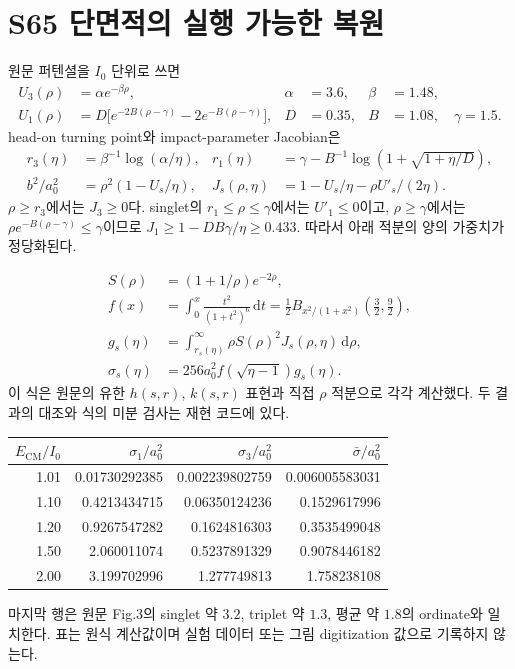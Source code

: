 \documentclass[11pt,a4paper]{article}
\newcommand{\dd}{\mathrm d}\newcommand{\kb}{k_{\rm B}}\newcommand{\ev}{\epsilon_{\rm eV}}\newcommand{\eV}{\mathrm{eV}}\newcommand{\cm}{\mathrm{CM}}\newcommand{\lab}{\mathrm{lab}}
\numberwithin{equation}{section}
\begin{document}
\newpage
\section{S65 단면적의 실행 가능한 복원}
원문 퍼텐셜을 $I_0$ 단위로 쓰면
\begin{align}
U_3(\rho)&=\alpha e^{-\beta\rho},& \alpha&=3.6,&\beta&=1.48,\\
U_1(\rho)&=D\bigl[e^{-2B(\rho-\gamma)}-2e^{-B(\rho-\gamma)}\bigr],
&D&=0.35,&B&=1.08,\quad\gamma=1.5 .
\end{align}
head-on turning point와 impact-parameter Jacobian은
\begin{align}
r_3(\eta)&=\beta^{-1}\log(\alpha/\eta),&
r_1(\eta)&=\gamma-B^{-1}\log(1+\sqrt{1+\eta/D}),\\
b^2/a_0^2&=\rho^2(1-U_s/\eta),&
J_s(\rho,\eta)&=1-U_s/\eta-\rho U'_s/(2\eta).
\end{align}
$\rho\ge r_3$에서는 $J_3\ge0$다. singlet의 $r_1\le\rho\le\gamma$에서는 $U'_1\le0$이고, $\rho\ge\gamma$에서는 $\rho e^{-B(\rho-\gamma)}\le\gamma$이므로 $J_1\ge1-DB\gamma/\eta\ge0.433$. 따라서 아래 적분의 양의 가중치가 정당화된다.

\begin{align}
S(\rho)&=(1+1/\rho)e^{-2\rho},\\
f(x)&=\int_0^x\frac{t^2}{(1+t^2)^6}\,\dd t
=\frac12B_{x^2/(1+x^2)}\!\left(\frac32,\frac92\right),\\
g_s(\eta)&=\int_{r_s(\eta)}^\infty \rho S(\rho)^2J_s(\rho,\eta)\,\dd\rho,\\
\sigma_s(\eta)&=256a_0^2f(\sqrt{\eta-1})g_s(\eta).
\end{align}
이 식은 원문의 유한 $h(s,r)$, $k(s,r)$ 표현과 직접 $\rho$ 적분으로 각각 계산했다. 두 결과의 대조와 식의 미분 검사는 재현 코드에 있다.

\begin{center}\begin{tabular}{@{}rrrr@{}}\toprule
$E_\cm/I_0$ & $\sigma_1/a_0^2$ & $\sigma_3/a_0^2$ & $\bar\sigma/a_0^2$\\\midrule
1.01 & 0.01730292385 & 0.002239802759 & 0.006005583031\\
1.10 & 0.4213434715 & 0.06350124236 & 0.1529617996\\
1.20 & 0.9267547282 & 0.1624816303 & 0.3535499048\\
1.50 & 2.060011074 & 0.5237891329 & 0.9078446182\\
2.00 & 3.199702996 & 1.277749813 & 1.758238108\\\bottomrule
\end{tabular}\end{center}
마지막 행은 원문 Fig.3의 singlet 약 $3.2$, triplet 약 $1.3$, 평균 약 $1.8$의 ordinate와 일치한다. 표는 원식 계산값이며 실험 데이터 또는 그림 digitization 값으로 기록하지 않는다.
\end{document}
